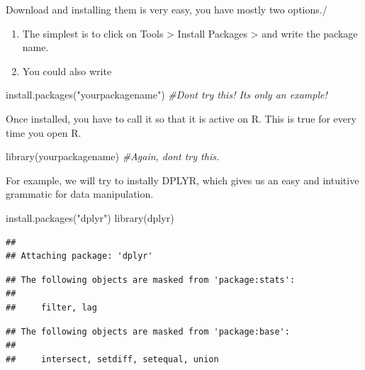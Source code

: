 \documentclass[
]{book}
\newenvironment{Shaded}{\begin{snugshade}}{\end{snugshade}}
\newcommand{\CommentTok}[1]{\textcolor[rgb]{0.56,0.35,0.01}{\textit{#1}}}
\newcommand{\FunctionTok}[1]{\textcolor[rgb]{0.00,0.00,0.00}{#1}}
\newcommand{\NormalTok}[1]{#1}
\newcommand{\StringTok}[1]{\textcolor[rgb]{0.31,0.60,0.02}{#1}}
\begin{document}
Download and installing them is very easy, you have mostly two options./

\begin{enumerate}
\def\labelenumi{\arabic{enumi}.}
\item
  The simplest is to click on Tools \textgreater{} Install Packages \textgreater{} and write the package name.
\item
  You could also write
\end{enumerate}

\begin{Shaded}
\begin{Highlighting}[]
\FunctionTok{install.packages}\NormalTok{(}\StringTok{"yourpackagename"}\NormalTok{)}
\CommentTok{\#Don\textquotesingle{}t try this! It\textquotesingle{}s only an example!}
\end{Highlighting}
\end{Shaded}

Once installed, you have to call it so that it is active on R. This is true for every time you open R.

\begin{Shaded}
\begin{Highlighting}[]
\FunctionTok{library}\NormalTok{(yourpackagename)}
\CommentTok{\#Again, don\textquotesingle{}t try this.}
\end{Highlighting}
\end{Shaded}

For example, we will try to instally DPLYR, which gives us an easy and intuitive grammatic for data manipulation.

\begin{Shaded}
\begin{Highlighting}[]
\FunctionTok{install.packages}\NormalTok{(}\StringTok{"dplyr"}\NormalTok{)}
\FunctionTok{library}\NormalTok{(dplyr)}
\end{Highlighting}
\end{Shaded}

\begin{verbatim}
## 
## Attaching package: 'dplyr'
\end{verbatim}

\begin{verbatim}
## The following objects are masked from 'package:stats':
## 
##     filter, lag
\end{verbatim}

\begin{verbatim}
## The following objects are masked from 'package:base':
## 
##     intersect, setdiff, setequal, union
\end{verbatim}
\end{document}
